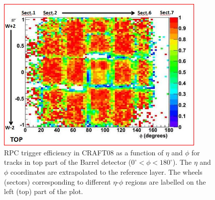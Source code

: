 \begin{figure}[hbtp]
  \begin{center}
     \includegraphics[width=0.9\textwidth]{eff_eta_phi_top_08_new}
      \hspace{1cm}
      \caption{RPC trigger efficiency in CRAFT08 as a function of $\eta$ and $\phi$ 
      for tracks in top part of the Barrel detector 
      ($ 0^\circ < \phi < 180^\circ $). The $\eta$ and $\phi$
      coordinates are extrapolated to the reference layer.
      The wheels (sectors) corresponding to different $\eta$-$\phi$
      regions are labelled on the left (top) part of the plot.
      }
    \label{fig:eff_eta_phi_top_08}
  \end{center}
\end{figure}

